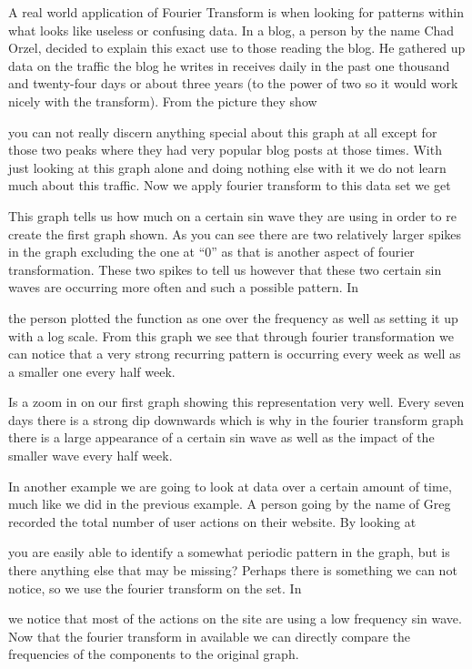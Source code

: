 \documentclass [../article.tex]{subfiles}
\begin{document}
  A real world application of Fourier Transform is when
  looking for patterns within what looks like useless or
  confusing data. In a blog, a person by the name Chad
  Orzel, decided to explain this exact use to those
  reading the blog. He gathered up data on the traffic the
  blog he writes in receives daily in the past one thousand
  and twenty-four days or about three years (to the power of
  two so it would work nicely with the transform).
  From the picture they show

  you can not really discern anything special about this graph
  at all except for those two peaks where they had very popular
  blog posts at those times. With just looking at this graph
  alone and doing nothing else with it we do not learn much
  about this traffic. Now we apply fourier transform to this
  data set we get

  This graph tells us how much on a certain sin wave they are
  using in order to re create the first graph shown. As you can
  see there are two relatively larger spikes in the graph
  excluding the one at “0” as that is another aspect of fourier
  transformation. These two spikes to tell us however that these
  two certain sin waves are occurring more often and such a
  possible pattern. In

  the person plotted the function as one over the frequency as
  well as setting it up with a log scale. From this graph we see
  that through  fourier transformation we can notice that a very
  strong recurring pattern is occurring every week as well as a
  smaller one every half week.

  Is a zoom in on our first graph showing this representation very
  well. Every seven days there is a strong dip downwards  which is
  why in the fourier transform graph there is a large appearance of
  a certain sin wave as well as the impact of the smaller wave every
  half week.

	In another example we are going to look at data over a certain
  amount of time, much like we did in the previous example. A
  person going by the name of Greg recorded the total number of
  user actions on their website. By looking at

  you are easily able to identify a somewhat periodic pattern in
  the graph, but is there anything else that may be missing?
  Perhaps there is something we can not notice, so we use the
  fourier transform on the set. In

  we notice that most of the actions on the site are using a low
  frequency sin wave. Now that the fourier transform in available
  we can directly compare the frequencies of the components to the
  original graph.
\end{document}
